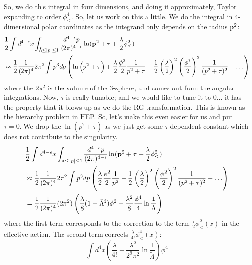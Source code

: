 So, we do this integral in four dimensions, and doing it approximately, Taylor expanding to order $\phi_<^4$. So, let us work on this a little. We do the integral in 4-dimensional polar coordinates as the integrand only depends on the radius $\mathbf{p}^2$:
\begin{equation}
    \begin{split}
        &\frac{1}{2}\int d^{4-\e}x \int_{\tilde{\Lambda} \leq \abs{p} \leq 1} \frac{d^{4-\e}p}{(2\pi)^{4-\e}} \ln(\v{p}^2 + \tau + \frac{\lambda}{2}\phi_<^2) 
        \\ &\approx \frac{1}{2}\frac{1}{(2\pi)^4}2\pi^2 \int p^3 dp \left(\ln\left(p^2 + \tau\right) + \frac{\lambda}{2}\frac{\phi^2}{2}\frac{1}{p^2 + \tau} - \frac{1}{2}\left(\frac{\lambda}{2}\right)^2\left(\frac{\phi^2}{2}\right)^2 \frac{1}{(p^2 + \tau)^2} + \ldots \right)
    \end{split}
\end{equation}
where the $2\pi^2$ is the volume of the 3-sphere, and comes out from the angular integrations. Now, $\tau$ is really tunable; and we would like to tune it to 0... it has the property that it blows up as we do the RG transformation. This is known as the hierarchy problem in HEP. So, let's make this even easier for us and put $\tau = 0$. We drop the $\ln(p^2 + \tau)$ as we just get some $\tau$ dependent constant which does not contribute to the singularity. 
\begin{equation}
    \begin{split}
        &\frac{1}{2}\int d^{4-\e}x \int_{\tilde{\Lambda} \leq \abs{p} \leq 1} \frac{d^{4-\e}p}{(2\pi)^{4-\e}} \ln(\v{p}^2 + \tau + \frac{\lambda}{2}\phi_<^2) 
        \\ &\approx \frac{1}{2}\frac{1}{(2\pi)^4}2\pi^2 \int p^3 dp \left(\frac{\lambda}{2}\frac{\phi^2}{2}\frac{1}{p^2} - \frac{1}{2}\left(\frac{\lambda}{2}\right)^2\left(\frac{\phi^2}{2}\right)^2 \frac{1}{(p^2 + \tau)^2} + \ldots \right)
        \\ &= \frac{1}{2}\frac{1}{(2\pi)^4}(2\pi^2)\left(\frac{\lambda}{8}(1 - \tilde{\Lambda}^2)\phi^2 - \frac{\lambda^2}{8}\frac{\phi^4}{4}\ln\frac{1}{\Lambda}\right)
    \end{split}
\end{equation}
where the first term corresponds to the correction to the term $\frac{\tau}{2}\phi_<^2(x)$ in the effective action. The second term corrects $\frac{\lambda}{4!}\phi_<^4(x)$:
\begin{equation}
    \int d^4 x \left(\frac{\lambda}{4!} - \frac{\lambda^2}{2^9\pi^2}\ln \frac{1}{\tilde{\Lambda}}\right)\phi^4
\end{equation}
